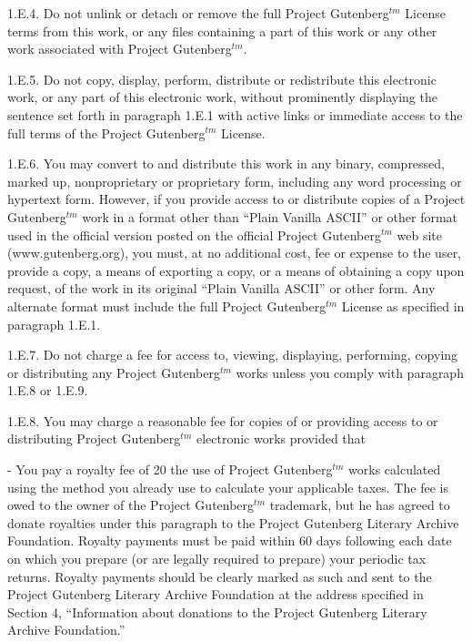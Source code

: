 1.E.4.  Do not unlink or detach or remove the full Project Gutenberg$^{tm}$
License terms from this work, or any files containing a part of this
work or any other work associated with Project Gutenberg$^{tm}$.

1.E.5.  Do not copy, display, perform, distribute or redistribute this
electronic work, or any part of this electronic work, without
prominently displaying the sentence set forth in paragraph 1.E.1 with
active links or immediate access to the full terms of the Project
Gutenberg$^{tm}$ License.

1.E.6.  You may convert to and distribute this work in any binary,
compressed, marked up, nonproprietary or proprietary form, including any
word processing or hypertext form.  However, if you provide access to or
distribute copies of a Project Gutenberg$^{tm}$ work in a format other than
“Plain Vanilla ASCII” or other format used in the official version
posted on the official Project Gutenberg$^{tm}$ web site (www.gutenberg.org),
you must, at no additional cost, fee or expense to the user, provide a
copy, a means of exporting a copy, or a means of obtaining a copy upon
request, of the work in its original “Plain Vanilla ASCII” or other
form.  Any alternate format must include the full Project Gutenberg$^{tm}$
License as specified in paragraph 1.E.1.

1.E.7.  Do not charge a fee for access to, viewing, displaying,
performing, copying or distributing any Project Gutenberg$^{tm}$ works
unless you comply with paragraph 1.E.8 or 1.E.9.

1.E.8.  You may charge a reasonable fee for copies of or providing
access to or distributing Project Gutenberg$^{tm}$ electronic works provided
that

- You pay a royalty fee of 20%
     the use of Project Gutenberg$^{tm}$ works calculated using the method
     you already use to calculate your applicable taxes.  The fee is
     owed to the owner of the Project Gutenberg$^{tm}$ trademark, but he
     has agreed to donate royalties under this paragraph to the
     Project Gutenberg Literary Archive Foundation.  Royalty payments
     must be paid within 60 days following each date on which you
     prepare (or are legally required to prepare) your periodic tax
     returns.  Royalty payments should be clearly marked as such and
     sent to the Project Gutenberg Literary Archive Foundation at the
     address specified in Section 4, “Information about donations to
     the Project Gutenberg Literary Archive Foundation.”

